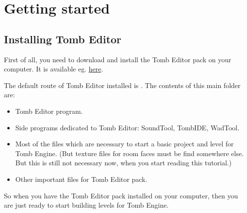 \part{Getting started}
\chapter{Installing Tomb Editor}
First of all, you need to download and install the Tomb Editor pack on your computer. It is available eg. \href{https://tombengine.com/}{here}.
\par The default route of Tomb Editor installed is . The contents of this main folder are:
\begin{itemize}
    \item Tomb Editor program.
    \item Side programs dedicated to Tomb Editor: SoundTool, TombIDE, WadTool.
    \item Most of the files which are necessary to start a basic project and level for Tomb Engine. (But texture files for room faces must be find somewhere else. But this is still not necessary now, when you start reading this tutorial.)
    \item Other important files for Tomb Editor pack.
\end{itemize}
So when you have the Tomb Editor pack installed on your computer, then you are just ready to start building levels for Tomb Engine. \cite{akyv_tutorial}

